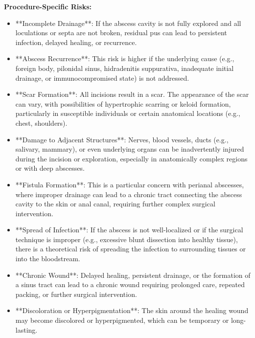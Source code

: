 \textbf{Procedure-Specific Risks:}
\begin{itemize}
  \item **Incomplete Drainage**: If the abscess cavity is not fully explored and all loculations or septa are not broken, residual pus can lead to persistent infection, delayed healing, or recurrence.

  \item **Abscess Recurrence**: This risk is higher if the underlying cause (e.g., foreign body, pilonidal sinus, hidradenitis suppurativa, inadequate initial drainage, or immunocompromised state) is not addressed.

  \item **Scar Formation**: All incisions result in a scar. The appearance of the scar can vary, with possibilities of hypertrophic scarring or keloid formation, particularly in susceptible individuals or certain anatomical locations (e.g., chest, shoulders).

  \item **Damage to Adjacent Structures**: Nerves, blood vessels, ducts (e.g., salivary, mammary), or even underlying organs can be inadvertently injured during the incision or exploration, especially in anatomically complex regions or with deep abscesses.

  \item **Fistula Formation**: This is a particular concern with perianal abscesses, where improper drainage can lead to a chronic tract connecting the abscess cavity to the skin or anal canal, requiring further complex surgical intervention.

  \item **Spread of Infection**: If the abscess is not well-localized or if the surgical technique is improper (e.g., excessive blunt dissection into healthy tissue), there is a theoretical risk of spreading the infection to surrounding tissues or into the bloodstream.

  \item **Chronic Wound**: Delayed healing, persistent drainage, or the formation of a sinus tract can lead to a chronic wound requiring prolonged care, repeated packing, or further surgical intervention.

  \item **Discoloration or Hyperpigmentation**: The skin around the healing wound may become discolored or hyperpigmented, which can be temporary or long-lasting.
\end{itemize}

